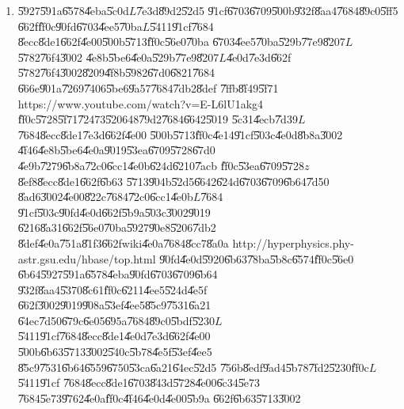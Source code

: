\begin{enumerate}
\item \U{5927}\U{591a}\U{6578}\U{4eba}\U{5c0d}$L$\U{7e3d}\U{89d2}\U{52d5}%
\U{91cf}\U{6703}\U{6709}\U{500b}\U{932f}\U{8aa4}\U{7684}\U{89c0}\U{5ff5}%
\U{662f}\U{ff0c}\U{90fd}\U{6703}\U{4ee5}\U{70ba}$L$\U{5411}\U{91cf}\U{7684}%
\U{8ecc}\U{8de1}\U{662f}\U{4e00}\U{500b}\U{5713}\U{ff0c}\U{56e0}\U{70ba}%
\U{6703}\U{4ee5}\U{70ba}\U{529b}\U{77e9}\U{8207}$L$\U{5782}\U{76f4}\U{3002}%
\U{4e8b}\U{5be6}\U{4e0a}\U{529b}\U{77e9}\U{8207}$L$\U{4e0d}\U{7e3d}\U{662f}%
\U{5782}\U{76f4}\U{3002}\U{8209}\U{4f8b}\U{5982}\U{67d0}\U{6821}\U{7684}%
\U{666e}\U{901a}\U{7269}\U{7406}\U{5be6}\U{9a57}\U{7684}\U{7db2}\U{8def}%
\U{7ffb}\U{8f49}\U{5f71}\newline
https://www.youtube.com/watch?v=E-L6lU1akg4\newline
\U{ff0c}\U{5728}\U{5f71}\U{7247}3\U{5206}48\U{79d2}\U{7684}\U{6642}\U{5019}%
\U{5c31}\U{4ecb}\U{7d39}$L$\U{7684}\U{8ecc}\U{8de1}\U{7e3d}\U{662f}\U{4e00}%
\U{500b}\U{5713}\U{ff0c}\U{4e14}\U{91cf}\U{503c}\U{4e0d}\U{8b8a}\U{3002}%
\U{4f46}\U{4e8b}\U{5be6}\U{4e0a}\U{9019}\U{53ea}\U{6709}\U{5728}\U{67d0}%
\U{4e9b}\U{7279}\U{6b8a}\U{72c0}\U{6cc1}\U{4e0b}\U{624d}\U{6210}\U{7acb}%
\U{ff0c}\U{53ea}\U{6709}\U{5728}$z$\U{8ef8}\U{8ecc}\U{8de1}\U{662f}\U{6b63}%
\U{5713}\U{904b}\U{52d5}\U{6642}\U{624d}\U{6703}\U{6709}\U{6b64}\U{7d50}%
\U{8ad6}\U{3002}\U{4e00}\U{822c}\U{7684}\U{72c0}\U{6cc1}\U{4e0b}$L$\U{7684}%
\U{91cf}\U{503c}\U{90fd}\U{4e0d}\U{662f}\U{5b9a}\U{503c}\U{3002}\U{9019}%
\U{6216}\U{8a31}\U{662f}\U{56e0}\U{70ba}\U{5927}\U{90e8}\U{5206}\U{7db2}%
\U{8def}\U{4e0a}\U{751a}\U{81f3}\U{662f}wiki\U{4e0a}\U{7684}\U{8cc7}\U{8a0a}%
http://hyperphysics.phy-astr.gsu.edu/hbase/top.html\newline
\U{90fd}\U{4e0d}\U{5920}\U{6b63}\U{78ba}\U{5b8c}\U{6574}\U{ff0c}\U{56e0}%
\U{6b64}\U{5927}\U{591a}\U{6578}\U{4eba}\U{90fd}\U{6703}\U{6709}\U{6b64}%
\U{932f}\U{8aa4}\U{5370}\U{8c61}\U{ff0c}\U{6211}\U{4ee5}\U{524d}\U{4e5f}%
\U{662f}\U{3002}\U{9019}\U{908a}\U{53ef}\U{4ee5}\U{85c9}\U{7531}\U{6a21}%
\U{64ec}\U{7d50}\U{679c}\U{6e05}\U{695a}\U{7684}\U{89c0}\U{5bdf}\U{5230}$L$%
\U{5411}\U{91cf}\U{7684}\U{8ecc}\U{8de1}\U{4e0d}\U{7e3d}\U{662f}\U{4e00}%
\U{500b}\U{6b63}\U{5713}\U{3002}\U{540c}\U{5b78}\U{4e5f}\U{53ef}\U{4ee5}%
\U{85c9}\U{7531}\U{6b64}\U{6559}\U{6750}\U{53ca}\U{6a21}\U{64ec}\U{52d5}%
\U{756b}\U{8edf}\U{9ad4}\U{5b78}\U{7fd2}\U{5230}\U{ff0c}$L$\U{5411}\U{91cf}%
\U{7684}\U{8ecc}\U{8de1}\U{6703}\U{843d}\U{5728}\U{4e00}\U{6c34}\U{5e73}%
\U{7684}\U{5e73}\U{9762}\U{4e0a}\U{ff0c}\U{4f46}\U{4e0d}\U{4e00}\U{5b9a}%
\U{662f}\U{6b63}\U{5713}\U{3002}


\end{enumerate}
